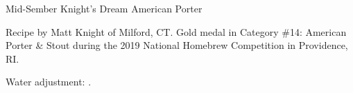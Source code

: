 \begin{recipe}{Mid-Sember Knight's Dream American Porter}

\begin{aboutblock}
Recipe by Matt Knight of Milford, CT. Gold medal in Category \#14: American
Porter \& Stout during the 2019 National Homebrew Competition in
Providence, RI. \sourceaha
\end{aboutblock}


\begin{methodandtiming}
 
\begin{mashsteps}
\end{mashsteps}

\begin{fermentationsteps}
\end{fermentationsteps}

\begin{directions}
Water adjustment: .
\end{directions}

\end{methodandtiming}

\recipebreak

\begin{ingredientsblock}

\begin{malts}
\end{malts}

\begin{hops}
\end{hops}


\end{ingredientsblock}

\end{recipe}
